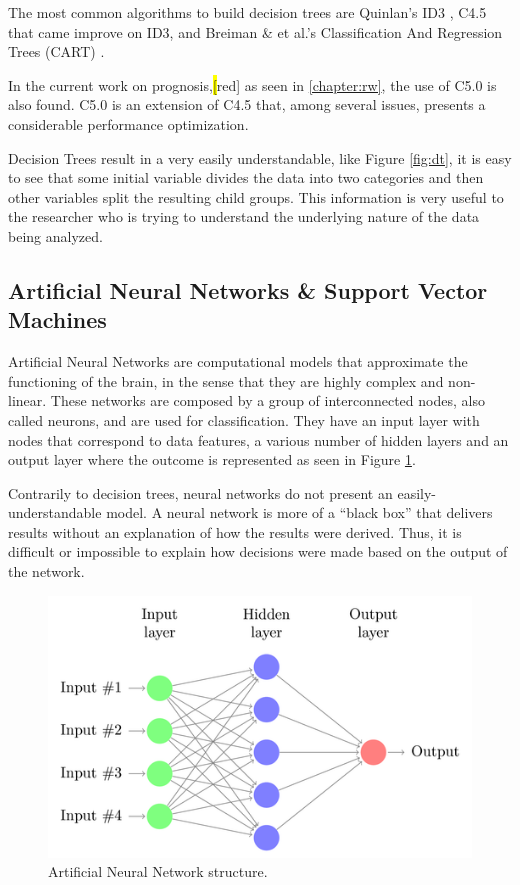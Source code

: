 The most common algorithms to build decision trees are Quinlan’s ID3 \cite{Quinlan1986}, C4.5
 \cite{Quinlan1993} that came improve on ID3, and Breiman \& et al.’s Classification And 
 Regression Trees (CART) \cite{Breiman1984}.
 
 In the current work on prognosis,\hl[red]{ as seen in \ref{chapter:rw}}, the use of C5.0 is also found. C5.0 is an extension of C4.5 that, among several issues, presents a considerable performance optimization. 
 
Decision Trees result in a very easily understandable, like Figure \ref{fig:dt}, it is easy to see that some initial variable divides the data into two categories and then other variables split the resulting child groups. This information is very useful to the researcher who is trying to understand the underlying nature of the data being analyzed.

\subsection{Artificial Neural Networks \& Support Vector Machines}
\label{subsection:nn}

Artificial Neural Networks are computational models that approximate the functioning of the brain, in the sense that they are highly
 complex and non-linear. These networks are composed by a group of interconnected nodes, also called neurons, and are used for classification. 
 They have an input layer with nodes that correspond to data features, a various number of hidden layers and an output layer where the outcome 
 is represented as seen in Figure \ref{fig:nn}.

Contrarily to decision trees, neural networks do not present an easily-understandable model.
A neural network is more of a “black box” that delivers results without an explanation of how the results were derived. Thus, it is difficult or
 impossible to explain how decisions were made based on the output of the network.

\begin{figure}[!htb]
  \centering
  \includegraphics[width=1\textwidth]{Figures/nn.png}
  \caption{Artificial Neural Network structure.}
  \label{fig:nn}
\end{figure}

